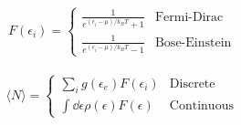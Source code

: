 

\vspace*{\fill}
\centering

\begin{align*}
   F(\epsilon_{i}) = 
   \begin{cases}
       \frac{1}{e^{(\epsilon_{i} - \mu)/k_{B}T} + 1} & \mbox{Fermi-Dirac} \\
       \frac{1}{e^{(\epsilon_{i} - \mu)/k_{B}T} - 1} & \mbox{Bose-Einstein}
   \end{cases}
\end{align*}

\begin{align*}
   \langle N \rangle = 
   \begin{cases}
       \sum_{i} g(\epsilon_{e})F(\epsilon_{i}) & \mbox{Discrete} \\
       \int \dd{\epsilon} \rho(\epsilon) F(\epsilon) & \mbox{Continuous}
   \end{cases}
\end{align*}

\centering
\vspace*{\fill}

